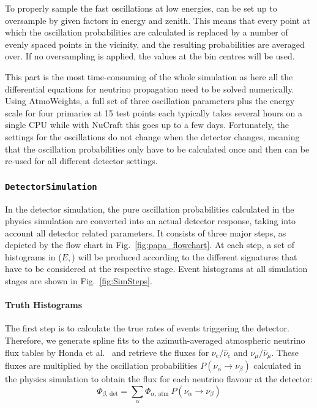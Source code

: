 
To properly sample the fast oscillations at low energies, \papa can be set up
to oversample by given factors in energy and zenith. This means that every
point at which the oscillation probabilities are calculated is replaced by a
number of evenly spaced points in the vicinity, and the resulting probabilities
are averaged over. If no oversampling is applied, the values at the bin
centres will be used.

This part is the most time-consuming of the whole simulation as here all the
differential equations for neutrino propagation need to be solved numerically.
Using AtmoWeights, a full set of three oscillation parameters plus the energy
scale for four primaries at 15 test points each typically takes several hours
on a single CPU while with NuCraft this goes up to a few days. Fortunately, the
settings for the oscillations do not change when the detector changes, meaning
that the oscillation probabilities only have to be calculated once and then can
be re-used for all different detector settings.


\subsubsection{\texttt{DetectorSimulation}}

In the detector simulation, the pure oscillation probabilities calculated in the
physics simulation are converted into an actual detector response, taking into
account all detector related parameters. It consists of three major steps, as
depicted by the flow chart in Fig.~\ref{fig:papa_flowchart}. At each step, a set
of histograms in ($E$,\,\coszen) will be produced according to the
different signatures that have to be considered at the respective stage. Event
histograms at all simulation stages are shown in Fig.~\ref{fig:SimSteps}.


\paragraph{Truth Histograms}

The first step is to calculate the true rates of events triggering the
detector. Therefore, we generate spline fits to the azimuth-averaged
atmospheric neutrino flux tables by Honda et al.\ \cite{Honda,
HondaSP} and retrieve the fluxes for
$\nu_e/\bar\nu_e$ and $\nu_\mu/\bar\nu_\mu$. These fluxes are multiplied by the
oscillation probabilities $P(\nu_\alpha \to \nu_\beta)$ calculated in the
physics simulation to obtain the flux for each neutrino flavour at the
detector:
\begin{equation}
 \Phi_{\beta,\,\mathrm{det}} =
   \sum_\alpha \Phi_{\alpha,\,\mathrm{atm}}\ P(\nu_\alpha\to\nu_\beta)
\end{equation}

